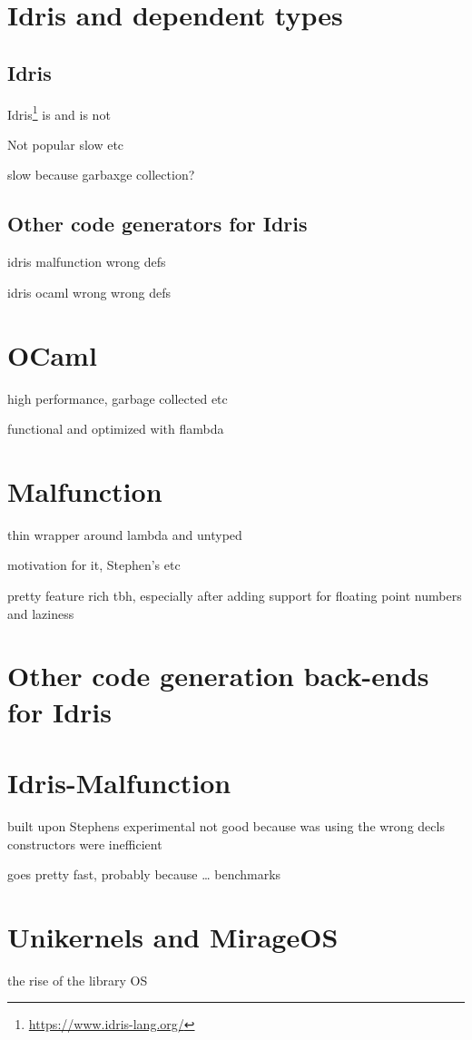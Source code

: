 \section{Idris and dependent types}
\subsection{Idris}
Idris\footnote{\url{https://www.idris-lang.org/}} is and is not

Not popular slow etc 

slow because garbaxge collection?


\subsection{Other code generators for Idris}
idris malfunction  wrong defs

idris ocaml wrong  wrong defs 

\section{OCaml}
high performance, garbage collected etc

functional and optimized with flambda

\section{Malfunction}
thin wrapper around lambda and untyped

motivation for it, Stephen's etc

pretty feature rich tbh, especially after adding support
for floating point numbers and laziness

\section{Other code generation back-ends for Idris}

\section{Idris-Malfunction}
built upon Stephens experimental 
not good because was using the wrong decls
constructors were inefficient

goes pretty fast, probably because \ldots
benchmarks

\section{Unikernels and MirageOS}
the rise of the library OS